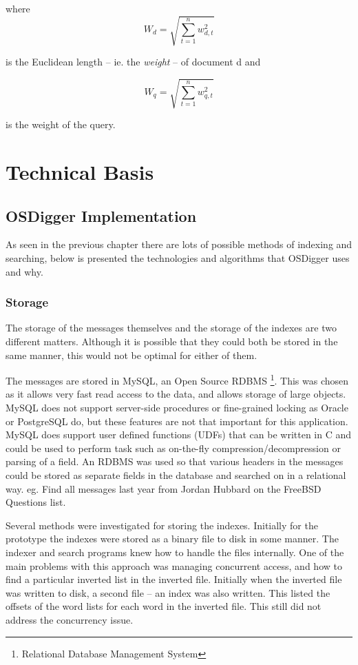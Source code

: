 where
\[
W_d = \sqrt{\sum^n_{t=1} w^2_{d,t}}
\]

is the Euclidean length -- ie. the \emph{weight} -- of document d and

\[
W_q = \sqrt{\sum^n_{t=1} w^2_{q,t}}
\]

is the weight of the query.

\chapter{Technical Basis}
\label{techbasis}


\section{OSDigger Implementation}
As seen in the previous chapter there are lots of possible methods of indexing and searching, below is presented the technologies and algorithms that OSDigger uses and why.

\subsection{Storage}
The storage of the messages themselves and the storage of the indexes are two different matters.  Although it is possible that they could both be stored in the same manner, this would not be optimal for either of them.

The messages are stored in MySQL, an Open Source RDBMS \footnote{Relational Database Management System}.  This was chosen as it allows very fast read access to the data, and allows storage of large objects.  MySQL does not support server-side procedures or fine-grained locking as Oracle or PostgreSQL \cite{www:postgresql} do, but these features are not that important for this application.  MySQL does support user defined functions (UDFs) that can be written in C and could be used to perform task such as on-the-fly compression/decompression or parsing of a field.  An RDBMS was used so that various headers in the messages could be stored as separate fields in the database and searched on in a relational way. eg. Find all messages last year from Jordan Hubbard on the FreeBSD Questions list.

Several methods were investigated for storing the indexes.  Initially for the prototype the indexes were stored as a binary file to disk in some manner.  The indexer and search programs knew how to handle the files internally.  One of the main problems with this approach was managing concurrent access, and how to find a particular inverted list in the inverted file.  Initially when the inverted file was written to disk, a second file -- an index was also written.  This listed the offsets of the word lists for each word in the inverted file.  This still did not address the concurrency issue.


